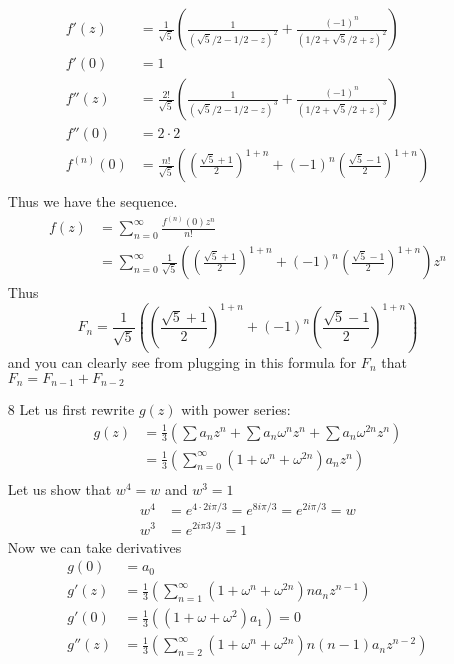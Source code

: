 \documentclass{article}
\begin{document}
\begin{enumerate}
\begin{align*}
        f'(z)&=\frac{1}{\sqrt{5}}\left(
          \frac{1}{(\sqrt{5}/2-1/2-z)^{2}}+
          \frac{(-1)^n}{(1/2+\sqrt{5}/2+z)^{2}}\right)\\
        f'(0)&=1\\
        f''(z)&=\frac{2!}{\sqrt{5}}\left(
          \frac{1}{(\sqrt{5}/2-1/2-z)^{3}}+
          \frac{(-1)^n}{(1/2+\sqrt{5}/2+z)^{3}}\right)\\
        f''(0)&=2\cdot2\\
        f^{(n)}(0)&=\frac{n!}{\sqrt{5}}\left(\left(\frac{\sqrt{5}+1}{2}\right)^{1+n}+\left(-1\right)^{n}\left(\frac{\sqrt{5}-1}{2}\right)^{1+n}\right)\\
      \end{align*}
      Thus we have the sequence.
      \begin{align*}
        f(z)&=\sum_{n=0}^\infty\frac{f^{(n)}(0)z^n}{n!}\\
        &=\sum_{n=0}^\infty\frac{1}{\sqrt{5}}\left(\left(\frac{\sqrt{5}+1}{2}\right)^{1+n}+\left(-1\right)^{n}\left(\frac{\sqrt{5}-1}{2}\right)^{1+n}\right)z^n
      \end{align*}
      Thus
      \[F_n=\frac{1}{\sqrt{5}}\left(\left(\frac{\sqrt{5}+1}{2}\right)^{1+n}+\left(-1\right)^{n}\left(\frac{\sqrt{5}-1}{2}\right)^{1+n}\right)\]
      and you can clearly see from plugging in this formula for $F_n$ that $F_n=F_{n-1}+F_{n-2}$
    \item[8]
      Let us first rewrite $g(z)$ with power series:
      \begin{align*}
        g(z)&=\frac{1}{3}\left(\sum a_nz^n+\sum a_n\omega^nz^n+\sum a_n\omega^{2n}z^n\right)\\
        &=\frac{1}{3}\left(\sum_{n=0}^\infty(1+\omega^n+\omega^{2n})a_nz^n\right)\\
      \end{align*}
      Let us show that $w^4=w$ and $w^3=1$
      \begin{align*}
        w^4&=e^{4\cdot2i\pi/3}=e^{8i\pi/3}=e^{2i\pi/3}=w\\
        w^3&=e^{2i\pi3/3}=1
      \end{align*}
      Now we can take derivatives
      \begin{align*}
        g(0)&=a_0\\
        g'(z)&=\frac{1}{3}\left(\sum_{n=1}^\infty(1+\omega^n+\omega^{2n})na_nz^{n-1}\right)\\
        g'(0)&=\frac{1}{3}\left((1+\omega+\omega^{2})a_1\right)=0\\
        g''(z)&=\frac{1}{3}\left(\sum_{n=2}^\infty(1+\omega^n+\omega^{2n})n(n-1)a_nz^{n-2}\right)\\

\end{align*}
\end{enumerate}
\end{document}
